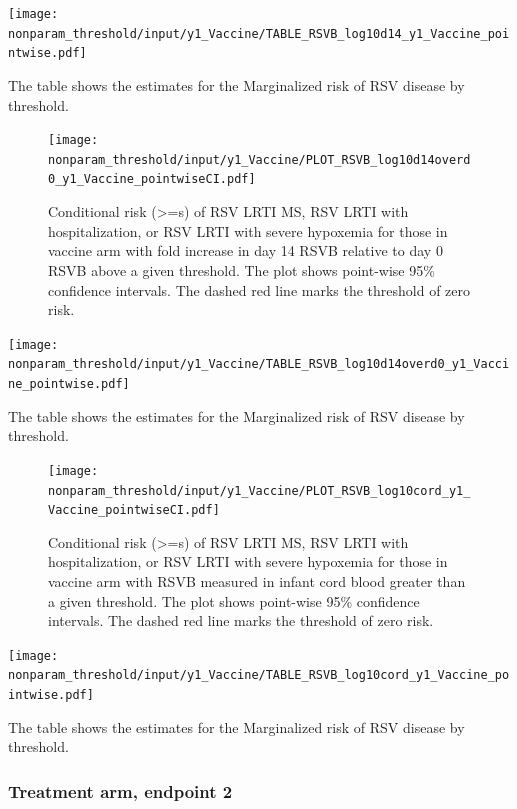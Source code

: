 \documentclass[11pt]{article}
\begin{document}
\begin{table}[H]
    \centering
    \texttt{[image: nonparam\_threshold/input/y1\_Vaccine/TABLE\_RSVB\_log10d14\_y1\_Vaccine\_pointwise.pdf]}
    \caption{The table shows the  estimates for the Marginalized risk of RSV disease by threshold. }
\end{table}

\begin{figure}[H]
    \centering
    \texttt{[image: nonparam\_threshold/input/y1\_Vaccine/PLOT\_RSVB\_log10d14overd0\_y1\_Vaccine\_pointwiseCI.pdf]}
    \caption{Conditional risk (>=s) of RSV LRTI MS, RSV LRTI with hospitalization, or RSV LRTI with severe hypoxemia for those in vaccine arm with fold increase in day 14 RSVB relative to day 0 RSVB above a given threshold. The plot shows point-wise 95\% confidence intervals. The dashed red line marks the threshold of zero risk.}
\end{figure}

\begin{table}[H]
    \centering
    \texttt{[image: nonparam\_threshold/input/y1\_Vaccine/TABLE\_RSVB\_log10d14overd0\_y1\_Vaccine\_pointwise.pdf]}
    \caption{The table shows the  estimates for the Marginalized risk of RSV disease by threshold. }
\end{table}

\begin{figure}[H]
    \centering
    \texttt{[image: nonparam\_threshold/input/y1\_Vaccine/PLOT\_RSVB\_log10cord\_y1\_Vaccine\_pointwiseCI.pdf]}
   \caption{Conditional risk (>=s) of RSV LRTI MS, RSV LRTI with hospitalization, or RSV LRTI with severe hypoxemia for those in vaccine arm with RSVB measured in infant cord blood greater than a given threshold. The plot shows point-wise 95\% confidence intervals. The dashed red line marks the threshold of zero risk.}
   \label{fig:PLOT_RSVB_log10cord_y1_Vaccine_pointwiseCI}
\end{figure}

\begin{table}[H]
    \centering
    \texttt{[image: nonparam\_threshold/input/y1\_Vaccine/TABLE\_RSVB\_log10cord\_y1\_Vaccine\_pointwise.pdf]}
    \caption{The table shows the  estimates for the Marginalized risk of RSV disease by threshold. }
\end{table}

\hypertarget{treatment-arm-endpoint-2}{%
\subsubsection{Treatment arm, endpoint 2}\label{treatment-arm-endpoint-2}}
\end{document}
